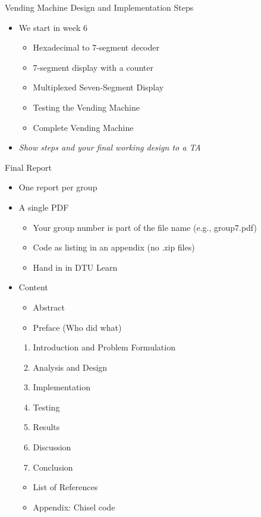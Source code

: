 \begin{frame}[fragile]{Vending Machine Design and Implementation Steps}
\begin{itemize}
\item We start in week 6
\begin{itemize}
\item Hexadecimal to 7-segment decoder
\item 7-segment display with a counter
\item Multiplexed Seven-Segment Display
\item Testing the Vending Machine
\item Complete Vending Machine
\end{itemize}
\item \emph{Show steps and your final working design to a TA}
\end{itemize}
\end{frame}

\begin{frame}[fragile]{Final Report}
\begin{itemize}
\item One report per group
\item A single PDF
\begin{itemize}
\item Your group number is part of the file name (e.g., group7.pdf)
\item Code as listing in an appendix (no .zip files)
\item Hand in in DTU Learn
\end{itemize}
\item Content
\begin{itemize}
\item Abstract
\item Preface (Who did what)
\end{itemize}
\begin{enumerate}
\item Introduction and Problem Formulation
\item Analysis and Design
\item Implementation
\item Testing
\item Results
\item Discussion
\item Conclusion
\end{enumerate}
\begin{itemize}
\item List of References
\item Appendix: Chisel code
\end{itemize}
\end{itemize}
\end{frame}

